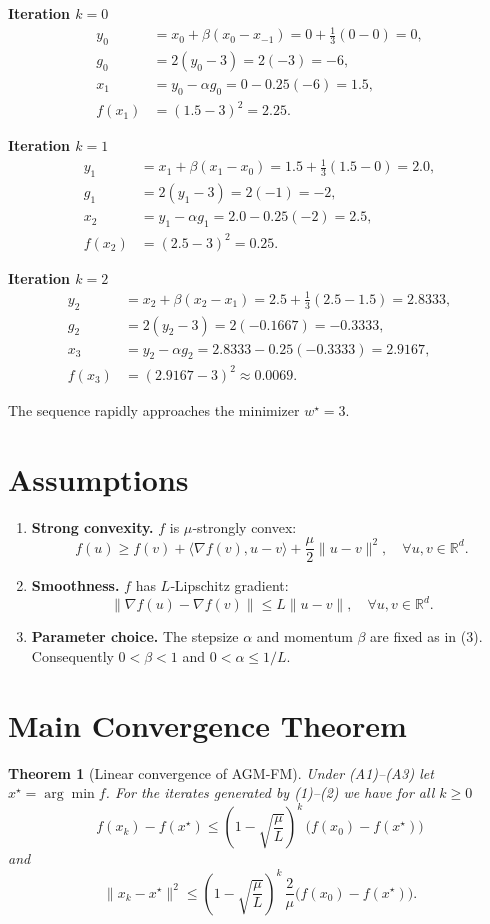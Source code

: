 \documentclass{article}
\newtheorem{theorem}{Theorem}
\newcommand{\grad}{\nabla}
\begin{document}
\medskip
\noindent\textbf{Iteration $k=0$}
\[
\begin{aligned}
y_0 &= x_0 + \beta (x_0-x_{-1}) =0+ \tfrac13(0-0)=0,\\
g_0 &= 2(y_0-3)=2(-3)=-6,\\
x_1 &= y_0 - \alpha g_0 =0-0.25(-6)=1.5,\\
f(x_1)&=(1.5-3)^2=2.25.
\end{aligned}
\]

\noindent\textbf{Iteration $k=1$}
\[
\begin{aligned}
y_1 &= x_1 + \beta (x_1-x_{0}) =1.5+\tfrac13(1.5-0)=2.0,\\
g_1 &= 2(y_1-3)=2(-1)=-2,\\
x_2 &= y_1 - \alpha g_1 =2.0-0.25(-2)=2.5,\\
f(x_2)&=(2.5-3)^2=0.25.
\end{aligned}
\]

\noindent\textbf{Iteration $k=2$}
\[
\begin{aligned}
y_2 &= x_2 + \beta (x_2-x_{1}) =2.5+\tfrac13(2.5-1.5)=2.8333,\\
g_2 &= 2(y_2-3)=2(-0.1667)=-0.3333,\\
x_3 &= y_2 - \alpha g_2 =2.8333-0.25(-0.3333)=2.9167,\\
f(x_3)&=(2.9167-3)^2\approx0.0069.
\end{aligned}
\]

The sequence rapidly approaches the minimizer $w^\star=3$.

\section*{Assumptions}
\begin{enumerate}
\item \textbf{Strong convexity.} $f$ is $\mu$‑strongly convex:
\[
f(u)\ge f(v)+\langle\grad f(v),u-v\rangle+\frac{\mu}{2}\|u-v\|^2,\quad\forall u,v\in\mathbb{R}^d.
\tag{A1}
\]
\item \textbf{Smoothness.} $f$ has $L$‑Lipschitz gradient:
\[
\|\grad f(u)-\grad f(v)\|\le L\|u-v\|,\quad\forall u,v\in\mathbb{R}^d.
\tag{A2}
\]
\item \textbf{Parameter choice.} The stepsize $\alpha$ and momentum $\beta$ are fixed as in (3). Consequently $0<\beta<1$ and $0<\alpha\le 1/L$.
\end{enumerate}

\section*{Main Convergence Theorem}
\begin{theorem}[Linear convergence of AGM‑FM]\label{thm:linear}
Under (A1)–(A3) let $x^\star=\arg\min f$. For the iterates generated by (1)–(2) we have for all $k\ge0$
\[
\boxed{
f(x_k)-f(x^\star)\le \left(1-\sqrt{\frac{\mu}{L}}\right)^{k}\,\bigl(f(x_0)-f(x^\star)\bigr)
}
\tag{4}
\]
and
\[
\|x_k-x^\star\|^2\le
\left(1-\sqrt{\frac{\mu}{L}}\right)^{k}\,
\frac{2}{\mu}\bigl(f(x_0)-f(x^\star)\bigr).
\tag{5}
\]
\end{theorem}
\end{document}
